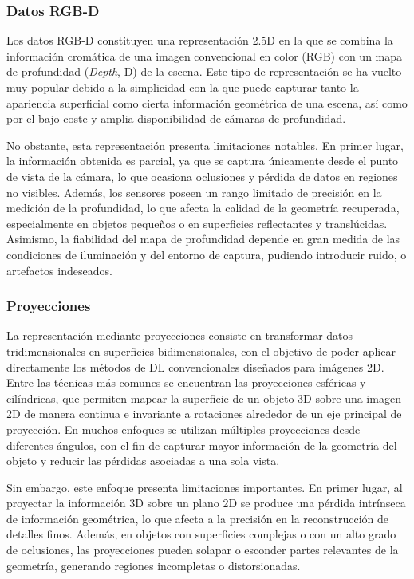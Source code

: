 \subsubsection{Datos RGB-D}
Los datos RGB-D constituyen una representación 2.5D en la que se combina la información cromática de una imagen convencional en color (RGB) con un mapa de profundidad (\textit{Depth}, D) de la escena. Este tipo de representación se ha vuelto muy popular debido a la simplicidad con la que puede capturar tanto la apariencia superficial como cierta información geométrica de una escena, así como por el bajo coste y amplia disponibilidad de cámaras de profundidad.

No obstante, esta representación presenta limitaciones notables. En primer lugar, la información obtenida es parcial, ya que se captura únicamente desde el punto de vista de la cámara, lo que ocasiona oclusiones y pérdida de datos en regiones no visibles. Además, los sensores poseen un rango limitado de precisión en la medición de la profundidad, lo que afecta la calidad de la geometría recuperada, especialmente en objetos pequeños o en superficies reflectantes y translúcidas. Asimismo, la fiabilidad del mapa de profundidad depende en gran medida de las condiciones de iluminación y del entorno de captura, pudiendo introducir ruido, o artefactos indeseados.

\subsubsection{Proyecciones}
La representación mediante proyecciones consiste en transformar datos tridimensionales en superficies bidimensionales, con el objetivo de poder aplicar directamente los métodos de DL convencionales diseñados para imágenes 2D. Entre las técnicas más comunes se encuentran las proyecciones esféricas y cilíndricas, que permiten mapear la superficie de un objeto 3D sobre una imagen 2D de manera continua e invariante a rotaciones alrededor de un eje principal de proyección. En muchos enfoques se utilizan múltiples proyecciones desde diferentes ángulos, con el fin de capturar mayor información de la geometría del objeto y reducir las pérdidas asociadas a una sola vista.

Sin embargo, este enfoque presenta limitaciones importantes. En primer lugar, al proyectar la información 3D sobre un plano 2D se produce una pérdida intrínseca de información geométrica, lo que afecta a la precisión en la reconstrucción de detalles finos. Además, en objetos con superficies complejas o con un alto grado de oclusiones, las proyecciones pueden solapar o esconder partes relevantes de la geometría, generando regiones incompletas o distorsionadas.

